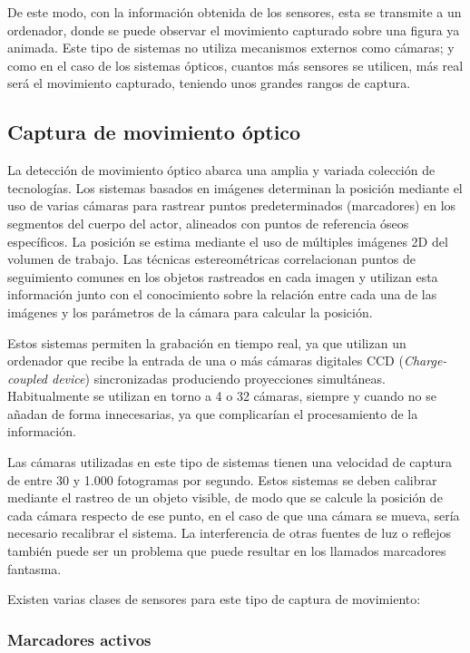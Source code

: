 De este modo, con la información obtenida de los sensores, esta se transmite a un ordenador, donde se puede observar el movimiento capturado sobre una figura ya animada. Este tipo de sistemas no utiliza mecanismos externos como cámaras; y como en el caso de los sistemas ópticos, cuantos más sensores se utilicen, más real será el movimiento capturado, teniendo unos grandes rangos de captura. 


\subsection{Captura de movimiento óptico}

La detección de movimiento óptico abarca una amplia y variada colección de tecnologías. Los sistemas basados en imágenes determinan la posición mediante el uso de varias cámaras para rastrear puntos predeterminados (marcadores) en los segmentos del cuerpo del actor, alineados con puntos de referencia óseos específicos. La posición se estima mediante el uso de múltiples imágenes 2D del volumen de trabajo. Las técnicas estereométricas correlacionan puntos de seguimiento comunes en los objetos rastreados en cada imagen y utilizan esta información junto con el conocimiento sobre la relación entre cada una de las imágenes y los parámetros de la cámara para calcular la posición.

Estos sistemas permiten la grabación en tiempo real, ya que utilizan un ordenador que recibe la entrada de una o más cámaras digitales CCD (\textit{Charge-coupled device}) sincronizadas produciendo proyecciones simultáneas. Habitualmente se utilizan en torno a 4 o 32 cámaras, siempre y cuando no se añadan de forma innecesarias, ya que complicarían el procesamiento de la información.

Las cámaras utilizadas en este tipo de sistemas tienen una velocidad de captura de entre 30 y 1.000 fotogramas por segundo. Estos sistemas se deben calibrar mediante el rastreo de un objeto visible, de modo que se calcule la posición de cada cámara respecto de ese punto, en el caso de que una cámara se mueva, sería necesario recalibrar el sistema. La interferencia de otras fuentes de luz o reflejos también puede ser un problema que puede resultar en los llamados marcadores fantasma.

Existen varias clases de sensores para este tipo de captura de movimiento:

\subsubsection{Marcadores activos}

